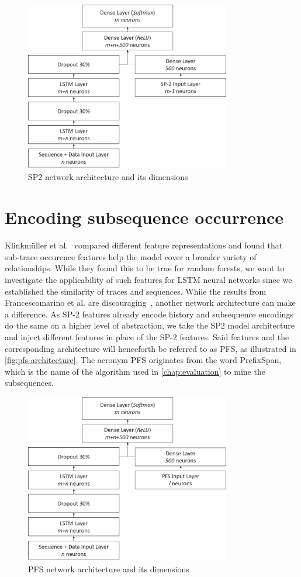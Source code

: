 \begin{figure}[ht]
    \centering
    \includegraphics[width=0.8\textwidth]{gfx/sp2-network-architecture.png}
    \caption{SP2 network architecture and its dimensions}
    \label{fig:sp2-architecture}
\end{figure}

\section{Encoding subsequence occurrence}
\label{sec:contrib:pfs-inspiration}
Klinkmüller et al.~\cite{klinkmuller2018reliablemonitoring} compared different feature representations and found that sub-trace occurence features help the model cover a broader variety of relationships. While they found this to be true for random forests, we want to investigate the applicability of such features for LSTM neural networks since we established the similarity of traces and sequences. While the results from Francescomarino et al. are discouraging~\cite{francescomarino2017}, another network architecture can make a difference. As SP-2 features already encode history and subsequence encodings do the same on a higher level of abstraction, we take the SP2 model architecture and inject different features in place of the SP-2 features. Said features and the corresponding architecture will henceforth be referred to as PFS, as illustrated in \autoref{fig:pfs-architecture}. The acronym PFS originates from the word PrefixSpan, which is the name of the algorithm used in \autoref{chap:evaluation} to mine the subsequences.

\begin{figure}[ht]
    \centering
    \includegraphics[width=0.8\textwidth]{gfx/pfs-network-architecture.png}
    \caption{PFS network architecture and its dimensions}
    \label{fig:pfs-architecture}
\end{figure}
